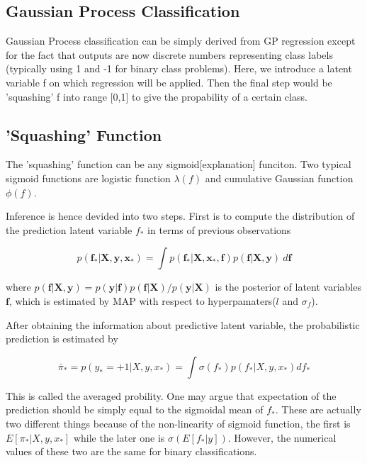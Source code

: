 \documentclass[11pt]{report}
\begin{document}
\begin{spacing}{2}
\section{Gaussian Process Classification}
Gaussian Process classification can be simply derived from GP regression except for the fact that outputs are now discrete numbers representing class labels (typically using 1 and -1 for binary class problems). Here, we introduce a latent variable f on which regression will be applied. Then the final step would be 'squashing' f into range [0,1] to give the propability of a certain class.


\subsection{'Squashing' Function}
The 'squashing' function can be any sigmoid[explanation] funciton. Two typical sigmoid functions are logistic function $\lambda (f)$ and cumulative Gaussian function $\phi (f)$.

Inference is hence devided into two steps. First is to compute  the distribution of the prediction latent variable $f_*$ in terms of previous observations 

\[p(\boldsymbol f_*|\boldsymbol X,\boldsymbol y,\boldsymbol x_*) = \int p(\boldsymbol f_*|\boldsymbol X,\boldsymbol x_*,\boldsymbol f)p(\boldsymbol f|\boldsymbol X,\boldsymbol y)\ d\boldsymbol f\]

where \(p(\boldsymbol f|\boldsymbol X,\boldsymbol y) = {p(\boldsymbol y|\boldsymbol f)p(\boldsymbol f|\boldsymbol X)}/{p(\boldsymbol y|\boldsymbol X)}\) is the posterior of latent variables $\boldsymbol f$, which is estimated by MAP with respect to hyperpamaters($l$ and $\sigma_f$).

After obtaining the information about predictive latent variable, the probabilistic prediction is estimated by

\begin{equation}
\bar{\pi}_* = p(y_* = +1|X,y,x_*) = \int \sigma (f_*)p(f_*|X,y,x_*) df_*
\end{equation}


This is called the averaged probility. One may argue that expectation of the prediction should be simply equal to the sigmoidal mean of $f_*$. These are actually two different things because of the non-linearity of sigmoid function, the first is $E[\pi_*|X,y,x_*]$ while the later one is $\sigma (E[f_*|y])$. However, the numerical values of these two are the same for binary classifications. 


\end{spacing}
\end{document}
